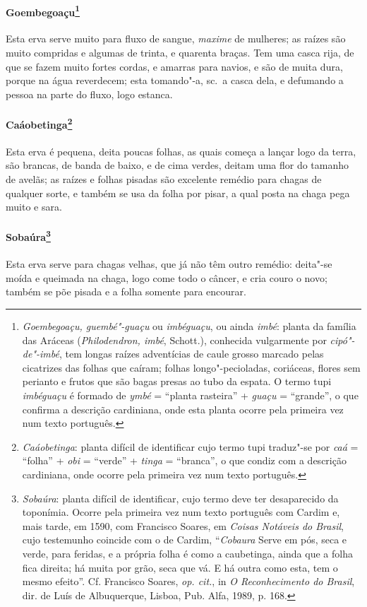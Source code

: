 \paragraph{Goembegoaçu\footnote{ \textit{Goembegoaçu, guembé"-guaçu} ou
\textit{imbéguaçu}, ou ainda \textit{imbé}: planta da família das
Aráceas (\textit{Philodendron, imbé}, Schott.), conhecida
vulgarmente por \textit{cipó"-de"-imbé}, tem longas raízes adventícias de
caule grosso marcado pelas cicatrizes das folhas que caíram; folhas
longo"-pecioladas, coriáceas, flores sem perianto e frutos que são bagas
presas ao tubo da espata. O termo tupi \textit{imbéguaçu} é formado de
\textit{ymbé} = ``planta rasteira'' + \textit{guaçu} = ``grande'', o que
confirma a descrição cardiniana, onde esta planta ocorre pela primeira
vez num texto português.}} Esta erva serve muito para fluxo
de sangue, \textit{maxime} de mulheres; as raízes são muito compridas e algumas
de trinta, e quarenta braças. Tem uma casca rija, de que se fazem muito
fortes cordas, e amarras para navios, e são de muita dura, porque na
água reverdecem; esta tomando"-a, sc.~a casca dela, e defumando a pessoa
na parte do fluxo, logo estanca.

\paragraph{Caáobetinga\footnote{ \textit{Caáobetinga}: planta difícil
de identificar cujo termo tupi traduz"-se por \textit{caá} = ``folha'' +
\textit{obi} = ``verde'' + \textit{tinga} = ``branca'', o que condiz com a
descrição cardiniana, onde ocorre pela primeira vez num texto
português.}} Esta erva é pequena, deita poucas folhas, as
quais começa a lançar logo da terra, são brancas, de banda de baixo, e
de cima verdes, deitam uma flor do tamanho de avelãs; as raízes e
folhas pisadas são excelente remédio para chagas de qualquer sorte, e
também se usa da folha por pisar, a qual posta na chaga pega muito e sara.

\paragraph{Sobaúra\footnote{ \textit{Sobaúra}: planta difícil de
identificar, cujo termo deve ter desaparecido da toponímia. Ocorre pela
primeira vez num texto português com Cardim e, mais tarde, em 1590, com
Francisco Soares, em \textit{Coisas Notáveis do Brasil}, cujo
testemunho coincide com o de Cardim, ``\textit{Cobaura} Serve em pós,
seca e verde, para feridas, e a própria folha é como a caubetinga,
ainda que a folha fica direita; há muita por grão, seca que vá. E há
outra como esta, tem o mesmo efeito''. Cf. Francisco Soares,
\textit{op. cit.}, in \textit{O Reconhecimento do Brasil}, dir. de Luís
de Albuquerque, Lisboa, Pub. Alfa, 1989, p. 168.}} Esta erva
serve para chagas velhas, que já não têm outro remédio: deita"-se moída
e queimada na chaga, logo come todo o câncer, e cria couro o novo;
também se põe pisada e a folha somente para encourar.

